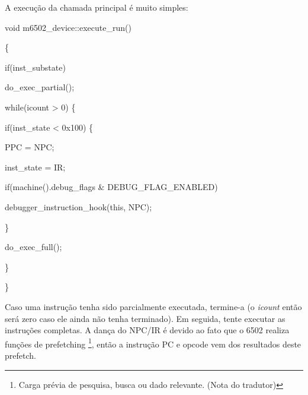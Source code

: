 \documentclass[letterpaper,10pt,brazil]{sphinxmanual}
\begin{document}
A execução da chamada principal é muito simples:

\begin{DUlineblock}{0em}
\item[] void m6502\_device::execute\_run()
\item[] \{
\item[]
\begin{DUlineblock}{\DUlineblockindent}
\item[] if(inst\_substate)
\item[]
\begin{DUlineblock}{\DUlineblockindent}
\item[] do\_exec\_partial();
\item[] 
\end{DUlineblock}
\item[] while(icount \textgreater{} 0) \{
\item[]
\begin{DUlineblock}{\DUlineblockindent}
\item[] if(inst\_state \textless{} 0x100) \{
\item[]
\begin{DUlineblock}{\DUlineblockindent}
\item[] PPC = NPC;
\item[] inst\_state = IR;
\item[] if(machine().debug\_flags \& DEBUG\_FLAG\_ENABLED)
\item[]
\begin{DUlineblock}{\DUlineblockindent}
\item[] debugger\_instruction\_hook(this, NPC);
\end{DUlineblock}
\end{DUlineblock}
\item[] \}
\item[] do\_exec\_full();
\end{DUlineblock}
\item[] \}
\end{DUlineblock}
\item[] \}
\end{DUlineblock}

Caso uma instrução tenha sido parcialmente executada, termine-a
(o \emph{icount} então será zero caso ele ainda não tenha terminado).
Em seguida, tente executar as instruções completas. A dança do NPC/IR é
devido ao fato que o 6502 realiza funções de prefetching \footnote[2]{\sphinxAtStartFootnote%
Carga prévia de pesquisa, busca ou dado relevante.
(Nota do tradutor)
}, então a
instrução PC e opcode vem dos resultados deste prefetch.
\end{document}
